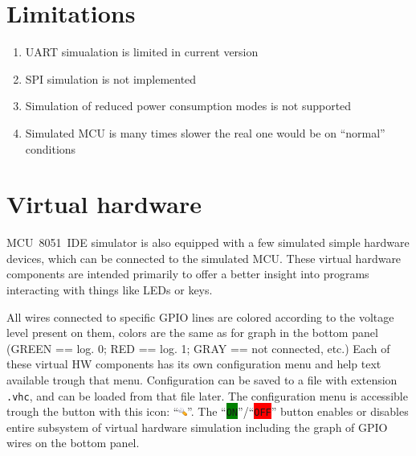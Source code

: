 \documentclass[a4paper,twoside,12pt]{book}
\newcommand{\fileextension}[1]{\texttt{#1}}
\begin{document}
	\section{Limitations}
		\begin{enumerate}
			\setlength{\itemsep}{-3pt}
			\item UART simualation is limited in current version
			\item SPI simulation is not implemented
			\item Simulation of reduced power consumption modes is not supported
			\item Simulated MCU is many times slower the real one would be on ``normal'' conditions
		\end{enumerate}

	\clearpage
	\section{Virtual hardware}
		MCU~8051~IDE simulator is also equipped with a few simulated simple hardware devices, which can be connected to the simulated MCU. These virtual hardware components are intended primarily to offer a better insight into programs interacting with things like LEDs or keys.

		All wires connected to specific GPIO lines are colored according to the voltage level present on them, colors are the same as for graph in the bottom panel ({\color{Green}\small{GREEN}} == log. 0; {\color{Red}\small{RED}} == log. 1; {\color{Gray}\small{GRAY}} == not connected, etc.) Each of these virtual HW components has its own configuration menu and help text available trough that menu. Configuration can be saved to a file with extension \fileextension{.vhc}, and can be loaded from that file later. The configuration menu is accessible trough the button with this icon:  ``\includegraphics[height=8pt]{img/configure.png}''. The \small{``\texttt{\colorbox{Green}{ON}}''/``\texttt{\colorbox{Red}{OFF}}''} button enables or disables entire subsystem of virtual hardware simulation including the graph of GPIO wires on the bottom panel.
\end{document}
